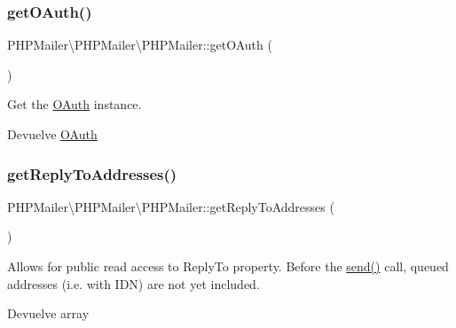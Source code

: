 \subsubsection{\texorpdfstring{get\+O\+Auth()}{getOAuth()}}
{\footnotesize\ttfamily P\+H\+P\+Mailer\textbackslash{}\+P\+H\+P\+Mailer\textbackslash{}\+P\+H\+P\+Mailer\+::get\+O\+Auth (\begin{DoxyParamCaption}{ }\end{DoxyParamCaption})}

Get the \hyperlink{classPHPMailer_1_1PHPMailer_1_1OAuth}{O\+Auth} instance.

\begin{DoxyReturn}{Devuelve}
\hyperlink{classPHPMailer_1_1PHPMailer_1_1OAuth}{O\+Auth} 
\end{DoxyReturn}
\mbox{\label{classPHPMailer_1_1PHPMailer_1_1PHPMailer_afee2c0551ea91355adedd9db0d6ed500}} 
\subsubsection{\texorpdfstring{get\+Reply\+To\+Addresses()}{getReplyToAddresses()}}
{\footnotesize\ttfamily P\+H\+P\+Mailer\textbackslash{}\+P\+H\+P\+Mailer\textbackslash{}\+P\+H\+P\+Mailer\+::get\+Reply\+To\+Addresses (\begin{DoxyParamCaption}{ }\end{DoxyParamCaption})}

Allows for public read access to \textquotesingle{}Reply\+To\textquotesingle{} property. Before the \hyperlink{classPHPMailer_1_1PHPMailer_1_1PHPMailer_a80ad2451096e940360c7439c22303edf}{send()} call, queued addresses (i.\+e. with I\+DN) are not yet included.

\begin{DoxyReturn}{Devuelve}
array 
\end{DoxyReturn}
\mbox{\label{classPHPMailer_1_1PHPMailer_1_1PHPMailer_a8c4c21e2c6194b01ef2766c2c5c46cb8}} 
